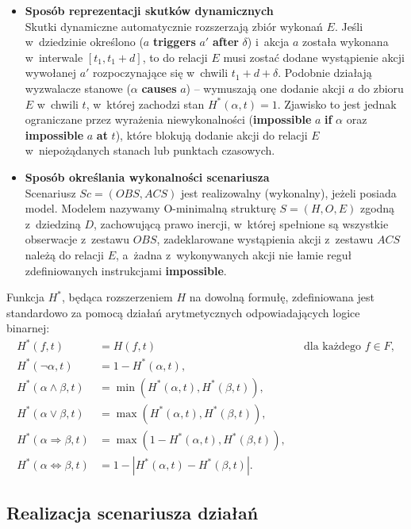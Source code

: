 \documentclass[12pt,a4paper]{article}
\begin{document}
\begin{itemize}
    \item \textbf{Sposób reprezentacji skutków dynamicznych} \\
    Skutki dynamiczne automatycznie rozszerzają zbiór wykonań $E$. Jeśli w~dziedzinie określono ($a$ \textbf{triggers} $a'$ \textbf{after} $\delta$) i~akcja $a$ została wykonana w~interwale $[t_1, t_1+d]$, to do relacji $E$ musi zostać dodane wystąpienie akcji wywołanej $a'$ rozpoczynające się w~chwili $t_1+d+\delta$. Podobnie działają wyzwalacze stanowe ($\alpha$ \textbf{causes} $a$) -- wymuszają one dodanie akcji $a$ do zbioru $E$ w~chwili $t$, w~której zachodzi stan $H^*(\alpha, t) = 1$. Zjawisko to jest jednak ograniczane przez wyrażenia niewykonalności (\textbf{impossible} $a$ \textbf{if} $\alpha$ oraz \textbf{impossible} $a$ \textbf{at} $t$), które blokują dodanie akcji do relacji $E$ w~niepożądanych stanach lub punktach czasowych.

    \item \textbf{Sposób określania wykonalności scenariusza} \\
    Scenariusz $Sc = (OBS, ACS)$ jest realizowalny (wykonalny), jeżeli posiada model. Modelem nazywamy O-minimalną strukturę $S=(H,O,E)$ zgodną z~dziedziną $D$, zachowującą prawo inercji, w~której spełnione są wszystkie obserwacje z~zestawu $OBS$, zadeklarowane wystąpienia akcji z~zestawu $ACS$ należą do relacji $E$, a~żadna z~wykonywanych akcji nie łamie reguł zdefiniowanych instrukcjami \textbf{impossible}.
\end{itemize}

Funkcja $H^{*}$, będąca rozszerzeniem $H$ na dowolną formułę, zdefiniowana jest standardowo za pomocą działań arytmetycznych odpowiadających logice binarnej:
\begin{align*}
H^{*}(f,t) &= H(f,t) && \text{dla każdego } f \in F, \\
H^{*}(\neg \alpha,t) &= 1 - H^{*}(\alpha,t), \\
H^{*}(\alpha \land \beta,t) &= \min(H^{*}(\alpha,t), H^{*}(\beta,t)), \\
H^{*}(\alpha \lor \beta,t) &= \max(H^{*}(\alpha,t), H^{*}(\beta,t)), \\
H^{*}(\alpha \Rightarrow \beta,t) &= \max(1 - H^{*}(\alpha,t), H^{*}(\beta,t)), \\
H^{*}(\alpha \Leftrightarrow \beta,t) &= 1 - |H^{*}(\alpha,t) - H^{*}(\beta,t)|.
\end{align*}

\subsection{Realizacja scenariusza działań}
\end{document}
